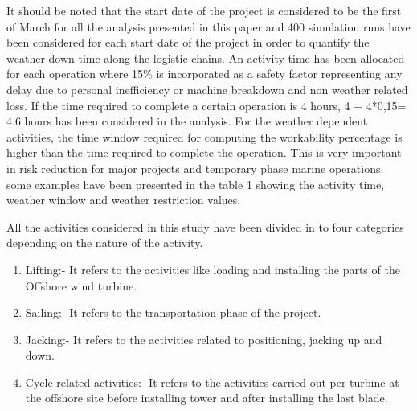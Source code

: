It should be noted that the start date of the project is considered to be the first of March for all the analysis presented in this paper and 400 simulation runs have been considered for each start date of the project in order to quantify the weather down time along the logistic chains. An activity time has been allocated for each operation where 15\%  is incorporated as a safety factor representing any delay due to personal inefficiency or machine breakdown and non weather related loss. If the time required to complete a certain operation is 4 hours, 4 + 4*0,15= 4.6 hours has been considered in the analysis. For the weather dependent activities, the time window required for computing the workability percentage is higher than the time required to complete the operation. This is very important  in risk reduction for major projects and temporary phase marine operations. some examples have been presented in the table 1 showing the activity time, weather window and weather restriction values. 

All the activities considered in this study have been divided in to four categories depending on the nature of the activity. 
\begin{enumerate}
\item
Lifting:- It refers to the activities like loading and installing the parts of the Offshore wind turbine.
\item 
Sailing:- It refers to the transportation phase of the project.
\item 
Jacking:- It refers to the activities related to positioning, jacking up and down.
\item
Cycle related activities:- It refers to the activities carried out per turbine at the offshore site before installing tower and after installing the last blade. 
\end{enumerate}


